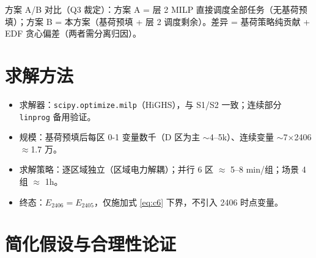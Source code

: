 \documentclass{internal-report}
\begin{document}
方案 A/B 对比（Q3 裁定）：方案 A = 层 2 MILP 直接调度全部任务（无基荷预填）；方案 B = 本方案（基荷预填 + 层 2 调度剩余）。差异 = 基荷策略纯贡献 + EDF 贪心偏差（两者需分离归因）。

\section{求解方法}

\begin{itemize}
  \item 求解器：\texttt{scipy.optimize.milp}（HiGHS），与 S1/S2 一致；连续部分 \texttt{linprog} 备用验证。
  \item 规模：基荷预填后每区 0-1 变量数千（D 区为主 $\sim$4--5k）、连续变量 $\sim$7$\times$2406$\approx$1.7 万。
  \item 求解策略：逐区域独立（区域电力解耦）；并行 6 区 $\approx$ 5--8 min/组；场景 4 组 $\approx$ 1h。
  \item 终态：$E_{2406}=E_{2405}$，仅施加式 \eqref{eq:c6} 下界，不引入 2406 时点变量。
\end{itemize}

\section{简化假设与合理性论证}
\end{document}
